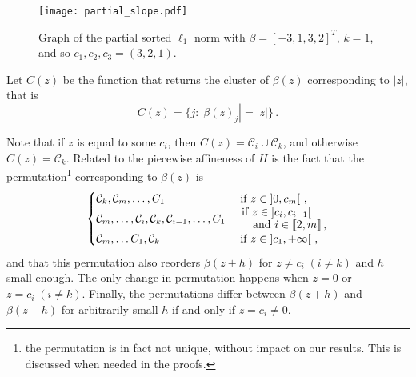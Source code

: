 \begin{figure}[htbp]
  \centering
  \texttt{[image: partial\_slope.pdf]}
  \caption{Graph of the partial sorted $\ell_1$ norm with \(\beta = [-3, 1, 3, 2]^T\), \(k = 1\), and so $c_1, c_2, c_3 = (3, 2, 1)$.}
  \label{fig:partial_slope}
\end{figure}

Let \(C(z)\) be the function that returns the cluster of $\beta(z)$ corresponding to \(|z|\), that is
\begin{equation}
  C(z) = \{j : |\beta(z)_j| = |z|\} \,.
\end{equation}

\begin{remark}\label{rem:permutation_C_z}
  Note that if $z$ is equal to some $c_i$, then $C(z) = \mathcal{C}_i \cup \mathcal{C}_k$, and otherwise $C(z) = \mathcal{C}_k$.
  Related to the piecewise affineness of $H$ is the fact that the permutation\footnote{the permutation is in fact not unique, without impact on our results. This is discussed when needed in the proofs.} corresponding to $\beta(z)$ is
  \begin{equation*}
    \begin{cases}
    \cC_k, \cC_m, \ldots, C_1
        &\text{ if } z \in \left]0, c_m\right[ \, , \\
    \cC_m, \ldots ,\cC_i, \cC_k, \cC_{i-1}, \ldots, C_1
        &\splitfrac{\text{ if } z \in \left]c_{i}, c_{i-1} \right[}{\text{ and } i \in \llbracket 2 , m \rrbracket\, ,} \\
    \cC_m, \ldots C_1,  \cC_k
        &\text{ if } z \in \left]c_1, +\infty \right[ \, , \\
    \end{cases}
  \end{equation*}
  and that this permutation also reorders $\beta(z \pm h)$ for $z \neq c_i \; (i \neq k)$ and $h$ small enough.
  The only change in permutation happens when $z = 0$ or $z = c_i \; (i \neq k)$.
  Finally, the permutations differ between $\beta(z + h)$ and $\beta(z - h)$ for arbitrarily small $h$ if and only if $z = c_i \neq 0$.
\end{remark}

